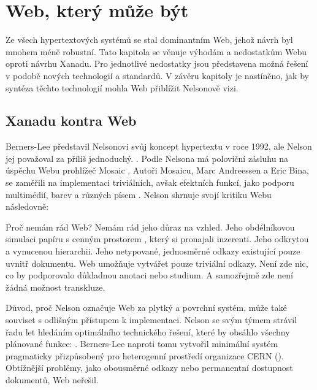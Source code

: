 \chapter{Web, který může být}
\label{ch:3}

Ze všech hypertextových systémů se stal dominantním Web, jehož návrh byl mnohem méně robustní. Tato kapitola se věnuje výhodám a nedostatkům Webu oproti návrhu Xanadu. Pro jednotlivé nedostatky jsou představena možná řešení v podobě nových technologií a standardů. V závěru kapitoly je nastíněno, jak by syntéza těchto technologií mohla Web přiblížit Nelsonově vizi.

\section{Xanadu kontra Web}
\label{sec:xanavsweb}

Berners-Lee představil Nelsonovi svůj koncept hypertextu v roce 1992, ale Nelson jej považoval za příliš jednoduchý. . Podle Nelsona má poloviční zásluhu na úspěchu Webu prohlížeč Mosaic \autocite{trollout}. Autoři Mosaicu, Marc Andreessen a Eric Bina, se zaměřili na implementaci triviálních, avšak efektních funkcí, jako podporu multimédií, barev a různých písem \autocite[71]{Berners-Lee1999}. Nelson shrnuje svojí kritiku Webu následovně:

\begin{quoted}{\autocite{trollout}}
Proč nemám rád Web? Nemám rád jeho \textelp{} důraz na vzhled. Jeho obdélníkovou simulaci papíru s cenným prostorem \textelp{}, který si pronajali inzerenti. Jeho odkrytou a vynucenou hierarchii. Jeho netypované, jednosměrné odkazy existující pouze uvnitř dokumentu. \textelp{} Web umožňuje vytvářet pouze triviální odkazy. Není zde nic, co by podporovalo důkladnou anotaci nebo studium. A samozřejmě zde není žádná možnost transkluze.
\end{quoted}

Důvod, proč Nelson označuje Web za plytký a povrchní systém, může také souviset s odlišným přístupem k implementaci. Nelson se svým týmem strávil řadu let hledáním optimálního technického řešení, které by obsáhlo všechny plánované funkce: . Berners-Lee naproti tomu vytvořil minimální systém pragmaticky přizpůsobený pro heterogenní prostředí organizace CERN (). Obtížnější problémy, jako obousměrné odkazy nebo permanentní dostupnost dokumentů, Web neřešil.

